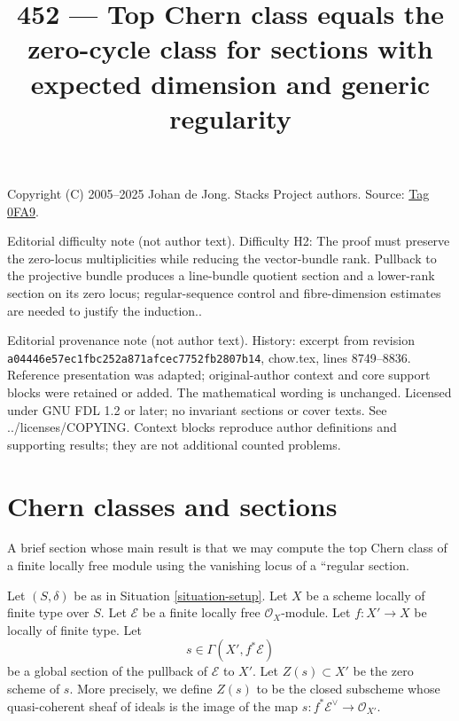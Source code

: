 \documentclass{amsart}
\theoremstyle{plain}
\theoremstyle{definition}
\theoremstyle{remark}
\numberwithin{equation}{subsection}
\begin{document}
\title[Stacks Project, Tag 0FA9]{452 --- Top Chern class equals the zero-cycle class for sections with expected dimension and generic regularity}
\maketitle
\noindent Copyright (C) 2005--2025 Johan de Jong. Stacks Project authors. Source: \href{https://stacks.math.columbia.edu/tag/0FA9}{Tag 0FA9}.

\noindent Editorial difficulty note (not author text). Difficulty H2: The proof must preserve the zero-locus multiplicities while reducing the vector-bundle rank. Pullback to the projective bundle produces a line-bundle quotient section and a lower-rank section on its zero locus; regular-sequence control and fibre-dimension estimates are needed to justify the induction..

\noindent Editorial provenance note (not author text). History: excerpt from revision \texttt{a0444\allowbreak 6e57e\allowbreak c1fbc\allowbreak 252a8\allowbreak 71afc\allowbreak ec775\allowbreak 2fb28\allowbreak 07b14}, chow.tex, lines 8749--8836. Reference presentation was adapted; original-author context and core support blocks were retained or added. The mathematical wording is unchanged. Licensed under GNU FDL 1.2 or later; no invariant sections or cover texts. See ../licenses/COPYING. Context blocks reproduce author definitions and supporting results; they are not additional counted problems.

\section{Chern classes and sections}
\label{section-top-chern-class}

\noindent
A brief section whose main result is that we may compute the
top Chern class of a finite locally free module using the
vanishing locus of a ``regular section.

\medskip\noindent
Let $(S, \delta)$ be as in Situation \ref{situation-setup}. Let $X$ be a scheme
locally of finite type over $S$. Let $\mathcal{E}$ be a finite locally
free $\mathcal{O}_X$-module. Let $f : X' \to X$ be locally of finite type. Let
$$
s \in \Gamma(X', f^*\mathcal{E})
$$
be a global section of the pullback of $\mathcal{E}$ to $X'$. Let
$Z(s) \subset X'$ be the zero scheme of $s$. More precisely, we define
$Z(s)$ to be the closed subscheme whose quasi-coherent sheaf
of ideals is the image of the map
$s : f^*\mathcal{E}^\vee \to \mathcal{O}_{X'}$.
\end{document}
